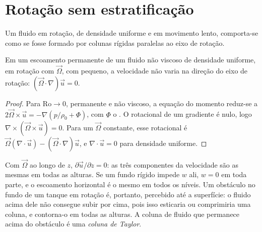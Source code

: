 \section{Rotação sem estratificação}\label{sec:b3:gfd-foundations:taylor}

Um fluido em rotação, de densidade uniforme e em movimento lento, comporta-se como se fosse
formado por colunas rígidas paralelas ao eixo de rotação.

\begin{theorem}\label{thm:b3:gfd-foundations:taylor-proudman}
Em um escoamento permanente de um fluido não viscoso de densidade uniforme, em rotação com
$\vec\Omega$, com  pequeno, a velocidade não varia
na direção do eixo de rotação: $(\vec\Omega\cdot\nabla)\vec u = 0$.
\end{theorem}

\begin{proof}
Para $\mathrm{Ro}\to 0$, permanente e não viscoso, a equação do momento reduz-se
a $2\vec\Omega\times\vec u = -\nabla(p/\rho_0 + \Phi)$, com $\Phi$ o
. O rotacional de um gradiente é nulo, logo $\nabla\times(\vec\Omega
\times\vec u) = 0$. Para um $\vec\Omega$ constante, esse rotacional é $\vec\Omega
(\nabla\cdot\vec u) - (\vec\Omega\cdot\nabla)\vec u$, e $\nabla\cdot\vec u
= 0$ para densidade uniforme.
\end{proof}

Com $\vec\Omega$ ao longo de $z$, $\partial\vec u/\partial z = 0$: as três
componentes da velocidade são as mesmas em todas as alturas. Se um fundo rígido impede
$w$ ali, $w = 0$ em toda parte, e o escoamento horizontal é o mesmo em todos os
níveis. Um obstáculo no fundo de um tanque em rotação é, portanto, percebido
até a superfície: o fluido acima dele não consegue subir por cima, pois isso
esticaria ou comprimiria uma coluna, e contorna-o em todas as alturas.
A coluna de fluido que permanece acima do obstáculo é uma \emph{coluna de
Taylor}.

